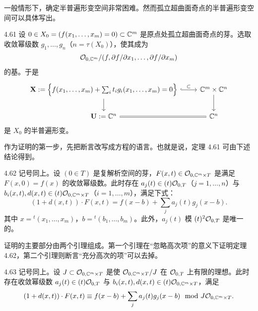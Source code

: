 一般情形下，确定半普遍形变空间非常困难。然而孤立超曲面奇点的半普遍形变空间可以具体写出。

\begin{theorem*}{4.61}
设 $0\in X_0=(f(x_1,\dots,x_m)=0)\subset\mathbb{C}^m$ 是原点处孤立超曲面奇点的芽。选取收敛幂级数 $g_1,\dots,g_n$（$n=\tau(X_0)$），使其成为
\[ \mathcal{O}_{0,\mathbb{C}^m}/(f,\partial f/\partial x_1,\dots,\partial f/\partial x_m) \]
的基。于是
\[
\begin{tikzcd}
\mathbf X:=\Bigl\{f(x_1,\dots,x_m)+\sum_i t_ig_i(x_1,\dots,x_m)=0\Bigr\} \arrow[d] \arrow[r,hook,"\subset"] & \C^m\times\C^n \arrow[d] \\
\mathbf U:=\C^n \arrow[r,equals] & \C^n
\end{tikzcd}
\]
是 $X_0$ 的半普遍形变。
\end{theorem*}

作为证明的第一步，先把断言改写成方程的语言。也就是说，定理 4.61 可由下述结论得到。

\begin{theorem*}{4.62}
记号同上。设 $(0\in T)$ 是复解析空间的芽，$F(x,t)\in\mathcal{O}_{0,\mathbb{C}^m\times T}$ 是满足 $F(x,0)=f(x)$ 的收敛幂级数。此时存在 $a_j(t)\in(t)\mathcal{O}_{0,T}$（$j=1,\dots,n$）与 $b_i(x,t),d(x,t)\in(t)\mathcal{O}_{0,\mathbb{C}^m\times T}$（$i=1,\dots,m$），满足下式：
\[ (1+d(x,t))\cdot F(x,t)=f(x-b)+\sum_j a_j(t)g_j(x-b). \]
其中 $x={}^t(x_1,\dots,x_m)$，$b={}^t(b_1,\dots,b_m)$。此外，$a_j(t)$ 模 $(t)^2\mathcal{O}_{0,T}$ 是唯一的。
\end{theorem*}

证明的主要部分由两个引理组成。第一个引理在“忽略高次项”的意义下证明定理 4.62，第二个引理则断言“充分高次的项”可以去掉。

\begin{lemmap}{4.63}
记号同上。设 $J\subset\mathcal{O}_{0,\mathbb{C}^m\times T}$ 是使 $\mathcal{O}_{0,\mathbb{C}^m\times T}/J$ 在 $\mathcal{O}_{0,T}$ 上有限的理想。此时存在收敛幂级数 $a_j(t)\in(t)\mathcal{O}_{0,T}$ 与 $b_i(x,t),d(x,t)\in(t)\mathcal{O}_{0,\mathbb{C}^m\times T}$，满足
\[ (1+d(x,t))\cdot F(x,t)\equiv f(x-b)+\sum_j a_j(t)g_j(x-b)\mod J\mathcal{O}_{0,\mathbb{C}^m\times T}. \]
\end{lemmap}


